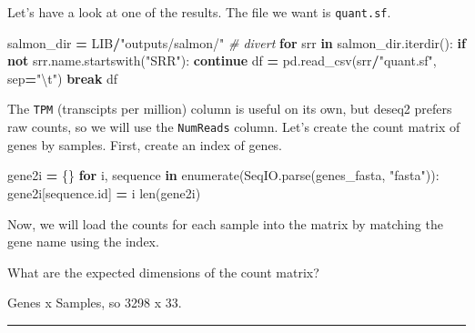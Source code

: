 \documentclass[
]{book}
\newenvironment{Shaded}{\begin{snugshade}}{\end{snugshade}}
\newcommand{\BuiltInTok}[1]{#1}
\newcommand{\CharTok}[1]{\textcolor[rgb]{0.31,0.60,0.02}{#1}}
\newcommand{\CommentTok}[1]{\textcolor[rgb]{0.56,0.35,0.01}{\textit{#1}}}
\newcommand{\ControlFlowTok}[1]{\textcolor[rgb]{0.13,0.29,0.53}{\textbf{#1}}}
\newcommand{\KeywordTok}[1]{\textcolor[rgb]{0.13,0.29,0.53}{\textbf{#1}}}
\newcommand{\NormalTok}[1]{#1}
\newcommand{\OperatorTok}[1]{\textcolor[rgb]{0.81,0.36,0.00}{\textbf{#1}}}
\newcommand{\StringTok}[1]{\textcolor[rgb]{0.31,0.60,0.02}{#1}}
\begin{document}
Let's have a look at one of the results. The file we want is \texttt{quant.sf}.

\begin{Shaded}
\begin{Highlighting}[numbers=left,,]
\NormalTok{salmon\_dir }\OperatorTok{=}\NormalTok{ LIB}\OperatorTok{/}\StringTok{"outputs/salmon/"} \CommentTok{\# divert}
\ControlFlowTok{for}\NormalTok{ srr }\KeywordTok{in}\NormalTok{ salmon\_dir.iterdir():}
    \ControlFlowTok{if} \KeywordTok{not}\NormalTok{ srr.name.startswith(}\StringTok{"SRR"}\NormalTok{): }\ControlFlowTok{continue}
\NormalTok{    df }\OperatorTok{=}\NormalTok{ pd.read\_csv(srr}\OperatorTok{/}\StringTok{"quant.sf"}\NormalTok{, sep}\OperatorTok{=}\StringTok{"}\CharTok{\textbackslash{}t}\StringTok{"}\NormalTok{)}
    \ControlFlowTok{break}
\NormalTok{df}
\end{Highlighting}
\end{Shaded}

The \texttt{TPM} (transcipts per million) column is useful on its own, but deseq2 prefers raw counts, so we will use the \texttt{NumReads} column.
Let's create the count matrix of genes by samples. First, create an index of genes.

\begin{Shaded}
\begin{Highlighting}[numbers=left,,]
\NormalTok{gene2i }\OperatorTok{=}\NormalTok{ \{\}}
\ControlFlowTok{for}\NormalTok{ i, sequence }\KeywordTok{in} \BuiltInTok{enumerate}\NormalTok{(SeqIO.parse(genes\_fasta, }\StringTok{"fasta"}\NormalTok{)):}
\NormalTok{    gene2i[sequence.}\BuiltInTok{id}\NormalTok{] }\OperatorTok{=}\NormalTok{ i}
\BuiltInTok{len}\NormalTok{(gene2i)}
\end{Highlighting}
\end{Shaded}

Now, we will load the counts for each sample into the matrix by matching the gene name using the index.

What are the expected dimensions of the count matrix?

Genes x Samples, so 3298 x 33.

\begin{center}\rule{0.5\linewidth}{0.5pt}\end{center}
\end{document}
